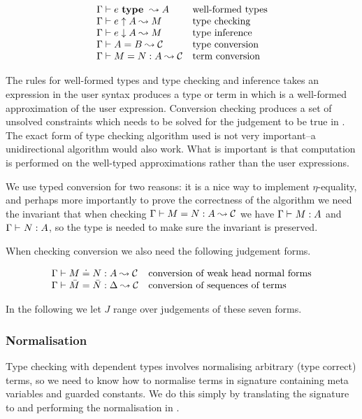 \[\begin{array}{ll}
    {\Gamma} \vdash {e} ~ \mathbf{type} ~ \leadsto {A} & \mbox{well-formed types} \\
    {\Gamma} \vdash {e} \uparrow {A} \leadsto {M} & \mbox{type checking} \\
    {\Gamma} \vdash {e} \downarrow {A} \leadsto {M} & \mbox{type inference} \\
    {\Gamma} \vdash {A} = {B} \leadsto {\mathcal{C}} & \mbox{type conversion} \\
    {\Gamma} \vdash {M} = {N} : {A} \leadsto {\mathcal{C}} & \mbox{term conversion} \\
\end{array}\]

The rules for well-formed types and type checking and inference takes an
expression in the user syntax produces a type or term in {\Core} which is a
well-formed approximation of the user expression. Conversion checking produces
a set of unsolved constraints which needs to be solved for the judgement to be
true in {\Core}. The exact form of type checking algorithm used is not very
important--a unidirectional algorithm would also work. What is important is
that computation is performed on the well-typed approximations rather than the
user expressions.

We use typed conversion for two reasons: it is a nice way to implement
$\eta$-equality, and perhaps more importantly to prove the correctness of the
algorithm we need the invariant that when checking ${\Gamma} \vdash {M} = {N} : {A} \leadsto {\mathcal{C}}$ we have
${\Gamma} \vdash_{} {M} : {A}$ and ${\Gamma} \vdash_{} {N} : {A}$, so the type is needed to
make sure the invariant is preserved.

When checking conversion we also need the following judgement forms.

\[\begin{array}{ll}
    {\Gamma} \vdash {M} \doteq {N} : {A} \leadsto {\mathcal{C}} & \mbox{conversion of weak head normal forms} \\
    {\Gamma} \vdash {\bar M} = {\bar N} : {\Delta} \leadsto {\mathcal{C}} & \mbox{conversion of sequences of terms} \\
\end{array}\]

In the following we let $J$ range over judgements of these seven forms.

\subsubsection{Normalisation}

Type checking with dependent types involves normalising arbitrary (type
correct) terms, so we need to know how to normalise terms in signature
containing meta variables and guarded constants. We do this simply by
translating the signature to {\Core} and performing the normalisation in
{\Core}.

